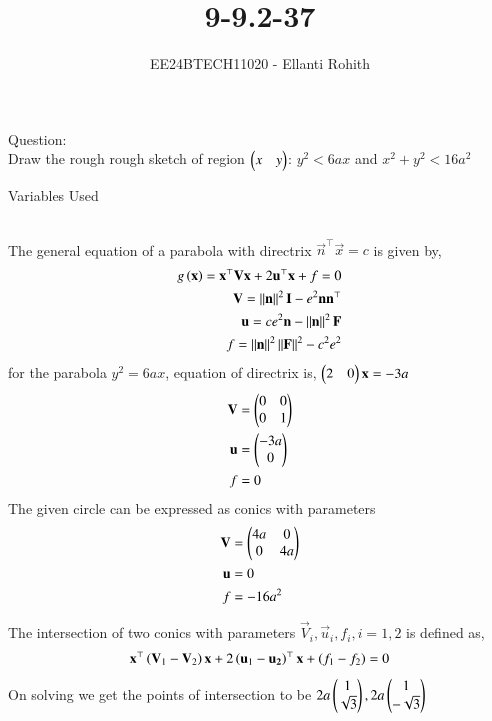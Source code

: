 \documentclass[journal]{IEEEtran}
\begin{document}

\vspace{3cm}

\title{9-9.2-37}
\author{EE24BTECH11020 - Ellanti Rohith}
{\let\newpage\relax\maketitle}
Question:\\
Draw the rough rough sketch of region $\begin{pmatrix}x&y\end{pmatrix}$: $y^2<6ax$ and $x^2+y^2<16a^2$ 
\begin{table}[h!]    
  \centering
  
  \caption{Variables Used}
  \label{tab1-9.2.1}
\end{table}\\
\solution
The general equation of a parabola with directrix $\vec{n}^{\top}\vec{x}=c$ is given by,
\begin{align}
	g\left(\mathbf{x}\right)=\mathbf{x}^{\top}\mathbf{V}\mathbf{x}+2\mathbf{u}^{\top}\mathbf{x}+f=0\\
	\mathbf{V}=\left\lVert\mathbf{n}\right\rVert^2\mathbf{I}-e^2\mathbf{n}\mathbf{n}^{\top}\\
	\mathbf{u}=ce^2\mathbf{n}-\left\lVert\mathbf{n}\right\rVert^2\mathbf{F}\\
	f=\left\lVert\mathbf{n}\right\rVert^2\left\lVert\mathbf{F}\right\rVert^2-c^2e^2
\end{align}
for the parabola $y^2=6ax$, equation of directrix is, $\begin{pmatrix}2&0\end{pmatrix}\mathbf{x}=-3a$
\begin{align}
	\mathbf{V}&=\begin{pmatrix}0&0\\0&1\end{pmatrix}\\
	\mathbf{u}&=\begin{pmatrix}-3a\\0\end{pmatrix}\\
	f&=0
\end{align}
The given circle can be expressed as conics with parameters
\begin{align}
	\mathbf{V}&=\begin{pmatrix}4a&0\\0&4a\end{pmatrix}\\
	\mathbf{u}&=0\\
	f&=-16a^2
\end{align}

The intersection of two conics with parameters $\vec{V}_i,\vec{u}_i,f_i, i=1,2$ is defined as,
\begin{align}
	\mathbf{x}^{\top}\left(\mathbf{V}_1-\mathbf{V}_2\right)\mathbf{x}+2\left(\mathbf{u}_1-\mathbf{u_2}\right)^{\top}\mathbf{x}+\left(f_1-f_2\right)=0
\end{align} 
On solving we get the points of intersection to be $2a\begin{pmatrix}1\\ \sqrt{3}\end{pmatrix},2a\begin{pmatrix}1\\-\sqrt{3}\end{pmatrix}$
\end{document}
